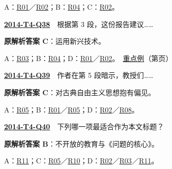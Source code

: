 \documentclass[11pt,a4paper]{article}
\begin{document}
\noindent A：\hyperref[cat-R01]{R01}／\hyperref[cat-R02]{R02}；B：\hyperref[cat-R04]{R04}；C：\hyperref[cat-R02]{R02}。\par\smallskip
{}\label{idx-2014-T4-Q38}\noindent\textbf{\href{https://zj139.github.io/math-notes/english/d0543caa2ebd73b99c00cc00/\#q38}{2014-T4-Q38}}　根据第 3 段，这份报告建议……\par\nopagebreak
\noindent\textbf{原解析答案 C}：运用新兴技术。\par\nopagebreak
\noindent A：\hyperref[cat-R03]{R03}；B：\hyperref[cat-R04]{R04}；D：\hyperref[cat-R01]{R01}／\hyperref[cat-R02]{R02}。　\hyperref[case-2014-T4-Q38]{重点例}（第\pageref{case-2014-T4-Q38}页）\par\smallskip
{}\label{idx-2014-T4-Q39}\noindent\textbf{\href{https://zj139.github.io/math-notes/english/d0543caa2ebd73b99c00cc00/\#q39}{2014-T4-Q39}}　作者在第 5 段暗示，教授们……\par\nopagebreak
\noindent\textbf{原解析答案 C}：对古典自由主义思想抱有偏见。\par\nopagebreak
\noindent A：\hyperref[cat-R05]{R05}；B：\hyperref[cat-R01]{R01}／\hyperref[cat-R05]{R05}；D：\hyperref[cat-R02]{R02}／\hyperref[cat-R08]{R08}。\par\smallskip
{}\label{idx-2014-T4-Q40}\noindent\textbf{\href{https://zj139.github.io/math-notes/english/d0543caa2ebd73b99c00cc00/\#q40}{2014-T4-Q40}}　下列哪一项最适合作为本文标题？\par\nopagebreak
\noindent\textbf{原解析答案 B}：不开放的教育与《问题的核心》。\par\nopagebreak
\noindent A：\hyperref[cat-R11]{R11}；C：\hyperref[cat-R05]{R05}／\hyperref[cat-R10]{R10}；D：\hyperref[cat-R02]{R02}／\hyperref[cat-R03]{R03}／\hyperref[cat-R11]{R11}。\par\smallskip
\clearpage
\end{document}
